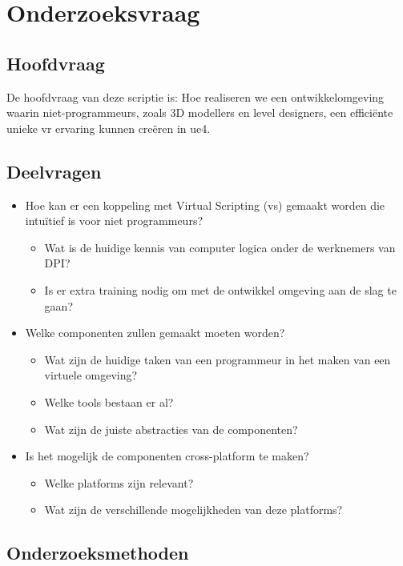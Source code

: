 \section{Onderzoeksvraag}

\subsection{Hoofdvraag}

De hoofdvraag van deze scriptie is: Hoe realiseren we een ontwikkelomgeving waarin niet-programmeurs, zoals 3D modellers en level designers, een efficiënte unieke \gls{vr} ervaring kunnen creëren in \gls{ue4}.

\subsection{Deelvragen}

\begin{itemize}  
\item Hoe kan er een koppeling met Virtual Scripting (\gls{vs}) gemaakt worden die intuïtief is voor niet programmeurs? 
	\begin{itemize}
	\item Wat is de huidige kennis van computer logica onder de werknemers van DPI?
	\item Is er extra training nodig om met de ontwikkel omgeving aan de slag te gaan?
	\end{itemize}
\item Welke componenten zullen gemaakt moeten worden?
	\begin{itemize}
	\item Wat zijn de huidige taken van een programmeur in het maken van een virtuele omgeving?
	\item Welke tools bestaan er al?
	\item Wat zijn de juiste abstracties van de componenten? 
	\end{itemize}
\item Is het mogelijk de componenten cross-platform te maken?
	\begin{itemize}
	\item Welke platforms zijn relevant?
	\item Wat zijn de verschillende mogelijkheden van deze platforms?
	\end{itemize}
\end{itemize}

\subsection{Onderzoeksmethoden}
\label{subsec:onderzoeksmethoden}

